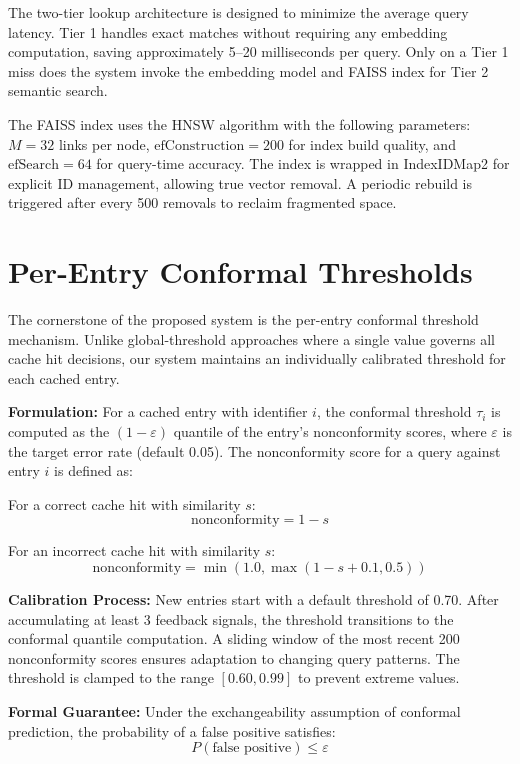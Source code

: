 \documentclass[12pt,a4paper]{report}
\begin{document}
The two-tier lookup architecture is designed to minimize the average query latency. Tier 1 handles exact matches without requiring any embedding computation, saving approximately 5--20 milliseconds per query. Only on a Tier 1 miss does the system invoke the embedding model and FAISS index for Tier 2 semantic search.

The FAISS index uses the HNSW algorithm with the following parameters: $M=32$ links per node, $\text{efConstruction}=200$ for index build quality, and $\text{efSearch}=64$ for query-time accuracy. The index is wrapped in IndexIDMap2 for explicit ID management, allowing true vector removal. A periodic rebuild is triggered after every 500 removals to reclaim fragmented space.

\section{Per-Entry Conformal Thresholds}

The cornerstone of the proposed system is the per-entry conformal threshold mechanism. Unlike global-threshold approaches where a single value governs all cache hit decisions, our system maintains an individually calibrated threshold for each cached entry.

\textbf{Formulation:} For a cached entry with identifier $i$, the conformal threshold $\tau_i$ is computed as the $(1 - \varepsilon)$ quantile of the entry's nonconformity scores, where $\varepsilon$ is the target error rate (default 0.05). The nonconformity score for a query against entry $i$ is defined as:

For a correct cache hit with similarity $s$:
\begin{equation}
\text{nonconformity} = 1 - s
\end{equation}

For an incorrect cache hit with similarity $s$:
\begin{equation}
\text{nonconformity} = \min(1.0, \max(1 - s + 0.1, 0.5))
\end{equation}

\textbf{Calibration Process:} New entries start with a default threshold of 0.70. After accumulating at least 3 feedback signals, the threshold transitions to the conformal quantile computation. A sliding window of the most recent 200 nonconformity scores ensures adaptation to changing query patterns. The threshold is clamped to the range $[0.60, 0.99]$ to prevent extreme values.

\textbf{Formal Guarantee:} Under the exchangeability assumption of conformal prediction, the probability of a false positive satisfies:
\begin{equation}
P(\text{false positive}) \leq \varepsilon
\end{equation}
\end{document}
